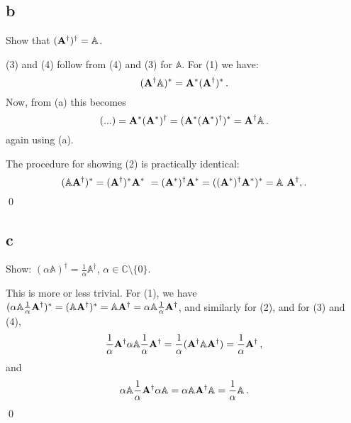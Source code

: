 \documentclass[11pt]{amsart}
\theoremstyle{definition}
\newcommand{\A}{\mathbb{A}}
\newcommand{\C}{\mathbb{C}}
\numberwithin{equation}{section}
\begin{document}
\subsection*{b}
Show that $(\Gai)^\dagger = \A$.

(3) and (4) follow from (4) and (3) for $\A$.
For (1) we have:
\begin{equation*}
(\Gai \A)^*
= \Ast \Gaist\,.
\end{equation*}
Now, from (a) this becomes
\begin{equation*}
(...) = \Ast (\Ast)^\dagger
= (\Ast (\Ast)^\dagger)^*
= \Gai \A\,.
\end{equation*}
again using (a).

The procedure for showing (2) is practically identical:
\begin{equation*}
(\A \Gai)^*
= \Gaist \Ast\
= (\Ast)^\dagger \Ast
= ((\Ast)^\dagger \Ast )^*
= \A\ \Gai,.
\end{equation*}
\qed
\subsection*{c}
Show: $(\alpha \A)^\dagger = \frac{1}{\alpha} \A^\dagger$, $\alpha \in \C\setminus \{0\}$.

This is more or less trivial. For (1), we have
$(\alpha \A \frac{1}{\alpha}\Gai)^* = (\A \Gai)^* = \A \Gai = \alpha \A \frac{1}{\alpha} \Gai$, and similarly for (2), and for (3) and (4),
\begin{equation}
\frac{1}{\alpha}\Gai \alpha \A \frac{1}{\alpha}\Gai
=
\frac{1}{\alpha}(\Gai \A \Gai)
=
\frac{1}{\alpha} \Gai\,,
\end{equation}
and
\begin{equation}
\alpha \A \frac{1}{\alpha}\Gai \alpha \A
=
\alpha \A \Gai \A = \frac{1}{\alpha} \A\,.
\end{equation}
\qed
\end{document}
